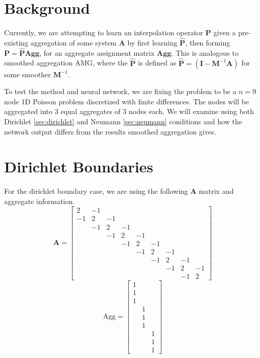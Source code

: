 \documentclass{article}
\newcommand{\mat}[1]{\bm{{#1}}}
\begin{document}
\section{Background}\label{sec:background}
Currently, we are attempting to learn an interpolation operator $\mat{P}$ given a pre-existing aggregation of some system $\mat{A}$ by first learning $\mat{\hat{P}}$, then forming $\mat{P}=\mat{\hat{P}}\mat{\text{Agg}}$, for an aggregate assignment matrix $\mat{\text{Agg}}$.  This is analogous to smoothed aggregation AMG, where the $\mat{\hat{P}}$ is defined as $\mat{\hat{P}} = \left(\mat{I} - \mat{M}^{-1}\mat{A}\right)$ for some smoother $\mat{M}^{-1}$\cite{SA}.

To test the method and neural network, we are fixing the problem to be a $n=9$ node 1D Poisson problem discretized with finite differences.  The nodes will be aggregated into 3 equal aggregates of 3 nodes each. We will examine using both Dirichlet \eqref{sec:dirichlet} and Neumann \eqref{sec:neumann} conditions and how the network output differs from the results smoothed aggregation gives.
\section{Dirichlet Boundaries}\label{sec:dirichlet}
For the dirichlet boundary case, we are using the following $\mat{A}$ matrix and aggregate information.
\begin{equation}
\mat{A} = \begin{bmatrix}
2 & -1 &  &  &  &  &  &  &  \\
-1 & 2 & -1 &  &  &  &  &  &  \\
 & -1 & 2 & -1 &  &  &  &  &  \\
 &  & -1 & 2 & -1 &  &  &  &  \\
 &  &  & -1 & 2 & -1 &  &  &  \\
 &  &  &  & -1 & 2 & -1 &  &  \\
 &  &  &  &  & -1 & 2 & -1 &  \\
 &  &  &  &  &  & -1 & 2 & -1 \\
 &  &  &  &  &  &  & -1 & 2
\end{bmatrix}
\end{equation}
\begin{equation}
\text{Agg} =  \begin{bmatrix}
1 &  &  \\
1 &  &  \\
1 &  &  \\
 & 1 &  \\
 & 1 &  \\
 & 1 &  \\
 &  & 1 \\
 &  & 1 \\
 &  & 1
\end{bmatrix}\label{eq:aggs}
\end{equation}
\end{document}
